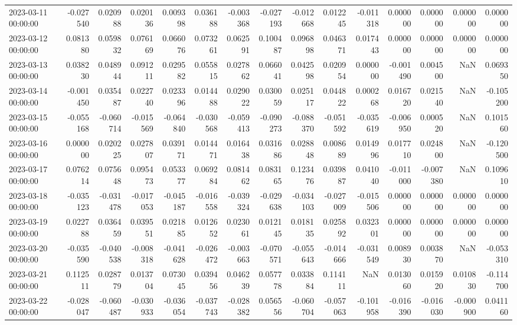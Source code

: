 \begin{tabular}{lrrrrrrrrrrrrrr}
2023-03-11 00:00:00 & -0.027540 & 0.020988 & 0.020136 & 0.009398 & 0.036188 & -0.003368 & -0.027193 & -0.012668 & 0.012245 & -0.011318 & 0.000000 & 0.000000 & 0.000000 & 0.000000 \\
2023-03-12 00:00:00 & 0.081380 & 0.059832 & 0.076169 & 0.066076 & 0.073261 & 0.062591 & 0.100487 & 0.096898 & 0.046371 & 0.017443 & 0.000000 & 0.000000 & 0.000000 & 0.000000 \\
2023-03-13 00:00:00 & 0.038230 & 0.048944 & 0.091211 & 0.029582 & 0.055815 & 0.027862 & 0.066041 & 0.042598 & 0.020954 & 0.000000 & -0.001490 & 0.004500 & NaN & 0.069350 \\
2023-03-14 00:00:00 & -0.001450 & 0.035487 & 0.022740 & 0.023396 & 0.014488 & 0.029022 & 0.030059 & 0.025117 & 0.044822 & 0.000268 & 0.016720 & 0.021540 & NaN & -0.105200 \\
2023-03-15 00:00:00 & -0.055168 & -0.060714 & -0.015569 & -0.064840 & -0.030568 & -0.059413 & -0.090273 & -0.088370 & -0.051592 & -0.035619 & -0.006950 & 0.000520 & NaN & 0.101560 \\
2023-03-16 00:00:00 & 0.000000 & 0.020225 & 0.027807 & 0.039171 & 0.014471 & 0.016438 & 0.031686 & 0.028848 & 0.008689 & 0.014996 & 0.017710 & 0.024800 & NaN & -0.120500 \\
2023-03-17 00:00:00 & 0.076214 & 0.075648 & 0.095473 & 0.053377 & 0.069284 & 0.081462 & 0.083165 & 0.123476 & 0.039887 & 0.041040 & -0.011000 & -0.007380 & NaN & 0.109610 \\
2023-03-18 00:00:00 & -0.035123 & -0.031478 & -0.017053 & -0.045187 & -0.016558 & -0.039324 & -0.029638 & -0.034103 & -0.027009 & -0.015506 & 0.000000 & 0.000000 & 0.000000 & 0.000000 \\
2023-03-19 00:00:00 & 0.022788 & 0.036459 & 0.039551 & 0.021885 & 0.012652 & 0.023061 & 0.012145 & 0.018135 & 0.025892 & 0.032301 & 0.000000 & 0.000000 & 0.000000 & 0.000000 \\
2023-03-20 00:00:00 & -0.035590 & -0.040538 & -0.008318 & -0.041628 & -0.026472 & -0.003663 & -0.070571 & -0.055643 & -0.014666 & -0.031549 & 0.008930 & 0.003870 & NaN & -0.053310 \\
2023-03-21 00:00:00 & 0.112511 & 0.028779 & 0.013704 & 0.073045 & 0.039456 & 0.046239 & 0.057778 & 0.033884 & 0.114111 & NaN & 0.013060 & 0.015920 & 0.010830 & -0.114700 \\
2023-03-22 00:00:00 & -0.028047 & -0.060487 & -0.030933 & -0.036054 & -0.037743 & -0.028382 & 0.056556 & -0.060704 & -0.057063 & -0.101958 & -0.016390 & -0.016030 & -0.000900 & 0.041160 \\

\end{tabular}
